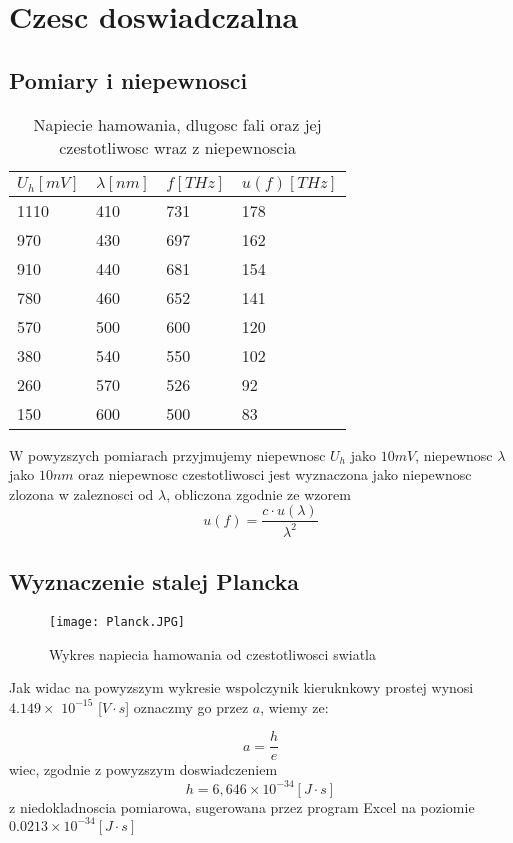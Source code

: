 \documentclass{article}
\begin{document}
\section{Czesc doswiadczalna}
\subsection{Pomiary i niepewnosci}
\begin{table}[h!]
\centering
\begin{tabular}{|l|l|l|l|}
\hline
\(U_{h}[mV]\)   & \(\lambda[nm]\)   &\(f[THz]\) & \(u(f)[THz]\)         \\ \hline
1110    &410    &731    &178\\ \hline
970     &430    &697    &162\\ \hline
910     &440    &681    &154\\ \hline
780     &460    &652    &141\\ \hline
570     &500    &600    &120\\ \hline
380     &540    &550    &102\\ \hline
260     &570    &526    &92\\ \hline
150     &600    &500    &83\\ \hline

\end{tabular}
\caption{Napiecie hamowania, dlugosc fali oraz jej czestotliwosc wraz z niepewnoscia}
\end{table}
W powyzszych pomiarach przyjmujemy niepewnosc \(U_{h}\) jako \(10mV\), niepewnosc \(\lambda\) jako \(10nm\) oraz niepewnosc czestotliwosci jest wyznaczona jako  niepewnosc zlozona w zaleznosci od \(\lambda\), obliczona zgodnie ze wzorem
\[
u(f)=\frac{c\cdot u(\lambda)}{\lambda^2}
\]
\subsection{Wyznaczenie stalej Plancka}

\begin{figure}[h!]
\centering
\texttt{[image: Planck.JPG]}
\caption{Wykres napiecia hamowania od czestotliwosci swiatla}
\end{figure}

Jak widac na powyzszym wykresie wspolczynik kieruknkowy prostej wynosi \(4.149\times\) \(10^{-15}\) [\(V \cdot s\)] oznaczmy go przez \(a\), wiemy ze:

\[
a=\frac{h}{e}
\]
wiec, zgodnie z powyzszym doswiadczeniem
\[
h=6,646\times 10^{-34} [J\cdot s] 
\]
z niedokladnoscia pomiarowa, sugerowana przez program Excel na poziomie \(0.0213\times 10^{-34} [J\cdot s] \)
\end{document}
